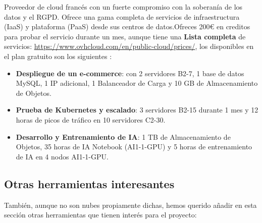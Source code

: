 Proveedor de cloud francés con un fuerte compromiso con la soberanía de los datos y el RGPD. Ofrece una gama completa de servicios de infraestructura (IaaS) y plataforma (PaaS) desde sus centros de datos.Ofreces 200€ en creditos para probar el servicio durante un mes, aunque tiene una \textbf{Lista completa} de servicios: \url{https://www.ovhcloud.com/en/public-cloud/prices/}, los disponibles en el plan gratuito son los siguientes \citep{OVHCloudFree}:
\begin{itemize}
\item \textbf{Despliegue de un e-commerce}:
con 2 servidores B2-7, 1 base de datos MySQL, 1 IP adicional, 1 Balanceador de Carga y 10 GB de Almacenamiento de Objetos.

\item \textbf{Prueba de Kubernetes y escalado}: 3 servidores B2-15 durante 1 mes y 12 horas de picos de tráfico en 10 servidores C2-30.

\item \textbf{Desarrollo y Entrenamiento de IA}: 1 TB de Almacenamiento de Objetos, 35 horas de IA Notebook (AI1-1-GPU) y 5 horas de entrenamiento de IA en 4 nodos AI1-1-GPU.  \\
\end{itemize}


\subsection{Otras herramientas interesantes}

También, aunque no son nubes propiamente dichas, hemos querido añadir en esta sección otras herramientas que tienen interés para el proyecto:

